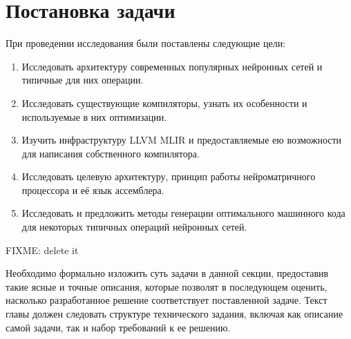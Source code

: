 \section{Постановка задачи}
\label{sec:Chapter1} 

При проведении исследования были поставлены следующие цели:

\begin{enumerate}
    \item Исследовать архитектуру современных популярных нейронных сетей
          и типичные для них операции.
    \item Исследовать существующие компиляторы, узнать их особенности и
          используемые в них оптимизации.
    \item Изучить инфраструктуру LLVM MLIR и предоставляемые ею возможности
          для написания собственного компилятора.
    \item Исследовать целевую архитектуру, принцип работы нейроматричного
          процессора и её язык ассемблера.
    \item Исследовать и предложить методы генерации оптимального машинного
          кода для некоторых типичных операций нейронных сетей. 
\end{enumerate}

FIXME: delete it

Необходимо формально изложить суть задачи в данной секции, предоставив такие
ясные и точные описания, которые позволят в последующем оценить, насколько
разработанное решение соответствует поставленной задаче. Текст главы должен
следовать структуре технического задания, включая как описание самой задачи,
так и набор требований к ее решению.

\newpage
